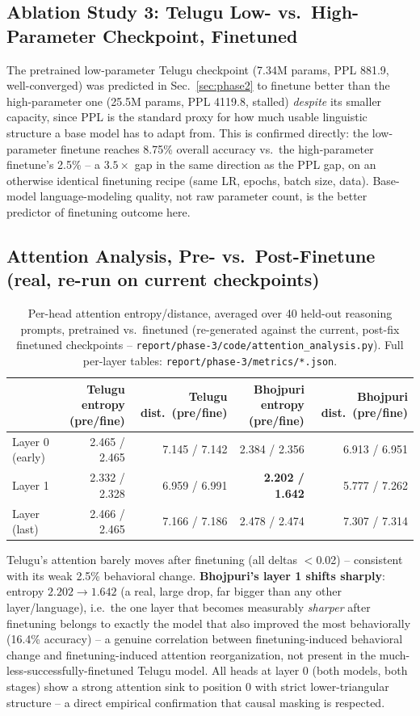 \documentclass[10pt,a4paper]{article}
\begin{document}
\subsection{Ablation Study 3: Telugu Low- vs.\ High-Parameter Checkpoint, Finetuned}
\label{sec:phase3-lowvhigh}
The pretrained low-parameter Telugu checkpoint (7.34M params, PPL 881.9, well-converged) was
predicted in Sec.~\ref{sec:phase2} to finetune better than the high-parameter one (25.5M params,
PPL 4119.8, stalled) \emph{despite} its smaller capacity, since PPL is the standard proxy for
how much usable linguistic structure a base model has to adapt from. This is confirmed directly:
the low-parameter finetune reaches 8.75\% overall accuracy vs.\ the high-parameter finetune's
2.5\% -- a $3.5\times$ gap in the same direction as the PPL gap, on an otherwise identical
finetuning recipe (same LR, epochs, batch size, data). Base-model language-modeling quality, not
raw parameter count, is the better predictor of finetuning outcome here.

\subsection{Attention Analysis, Pre- vs.\ Post-Finetune (real, re-run on current checkpoints)}
\begin{table}[H]\centering\footnotesize
\begin{tabular}{lrrrr}
\toprule
 & Telugu entropy (pre/fine) & Telugu dist.\ (pre/fine) & Bhojpuri entropy (pre/fine) & Bhojpuri dist.\ (pre/fine) \\
\midrule
Layer 0 (early) & 2.465 / 2.465 & 7.145 / 7.142 & 2.384 / 2.356 & 6.913 / 6.951 \\
Layer 1         & 2.332 / 2.328 & 6.959 / 6.991 & \textbf{2.202 / 1.642} & 5.777 / 7.262 \\
Layer (last)    & 2.466 / 2.465 & 7.166 / 7.186 & 2.478 / 2.474 & 7.307 / 7.314 \\
\bottomrule
\end{tabular}
\caption{Per-head attention entropy/distance, averaged over 40 held-out reasoning prompts,
pretrained vs.\ finetuned (re-generated against the current, post-fix finetuned checkpoints --
\texttt{report/phase-3/code/attention\_analysis.py}). Full per-layer tables:
\texttt{report/phase-3/metrics/*.json}.}
\label{tab:attn-p3}
\end{table}
\vspace{-8pt}

Telugu's attention barely moves after finetuning (all deltas $<$0.02) -- consistent with its
weak 2.5\% behavioral change. \textbf{Bhojpuri's layer 1 shifts sharply}: entropy
$2.202\!\to\!1.642$ (a real, large drop, far bigger than any other layer/language), i.e.\ the
one layer that becomes measurably \emph{sharper} after finetuning belongs to exactly the model
that also improved the most behaviorally (16.4\% accuracy) -- a genuine correlation between
finetuning-induced behavioral change and finetuning-induced attention reorganization, not
present in the much-less-successfully-finetuned Telugu model. All heads at layer 0 (both models,
both stages) show a strong attention sink to position 0 with strict lower-triangular structure --
a direct empirical confirmation that causal masking is respected.
\end{document}

